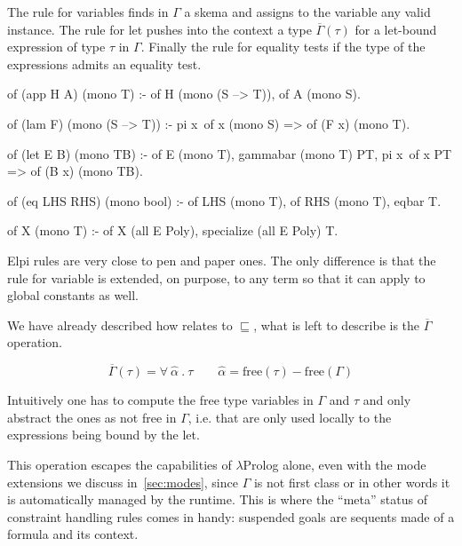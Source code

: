 \documentclass[a4paper, 11pt]{book}
\begin{document}
The rule for variables finds in $\Gamma$ a skema and assigns to the variable
any valid instance. The rule for let pushes into the context a type
$\overline{\Gamma}(\tau)$ for a let-bound expression of type $\tau$ in $\Gamma$.
Finally the rule for equality tests if the type of the expressions admits
an equality test.

\begin{elpicode}
of (app H A) (mono T) :-
  of H (mono (S --> T)),
  of A (mono S).

of (lam F) (mono (S --> T)) :-
  pi x\ of x (mono S) => of (F x) (mono T).

of (let E B) (mono TB) :-
  of E (mono T),
  gammabar (mono T) PT,
  pi x\ of x PT => of (B x) (mono TB).

of (eq LHS RHS) (mono bool) :-
  of LHS (mono T),
  of RHS (mono T),
  eqbar T.

of X (mono T) :- of X (all E Poly), specialize (all E Poly) T.
\end{elpicode}

Elpi rules are very close to pen and paper ones. The only difference is that
the rule for variable is extended, on purpose, to any term so that it
can apply to global constants as well.

We have already described how  relates to $\sqsubseteq$,
what is left to describe is the $\overline{\Gamma}$ operation.
  
$$
\overline{\Gamma}(\tau) = \forall\ \hat{\alpha}\ .\ \tau \quad\quad \hat{\alpha} = \textrm{free}(\tau) - \textrm{free}(\Gamma)
$$

Intuitively one has to compute the free type variables in $\Gamma$ and $\tau$
and only abstract the ones as not free in $\Gamma$, i.e. that are only used
locally to the expressions being bound by the let.

This operation escapes the capabilities of $\lambda$Prolog alone, even with
the mode extensions we discuss in~\ref{sec:modes}, since $\Gamma$ is not
first class or in other words it is automatically managed by the runtime.
This is where the ``meta'' status of constraint handling rules comes in
handy: suspended goals are sequents made of a formula and its context.
\end{document}
